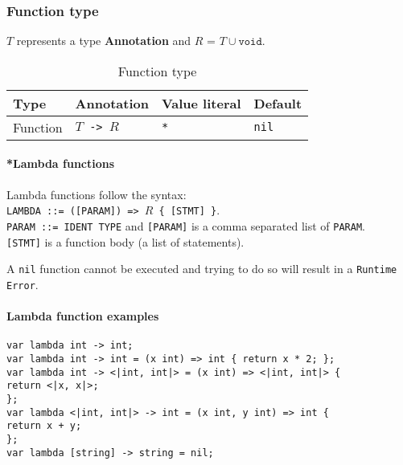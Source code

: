 \documentclass{article}
\begin{document}
\subsubsection{Function type}
$T$ represents a type \textbf{Annotation} and $R$ = $T \cup { \texttt{void} }$.

\begin{table}[h]
\centering
\label{function-type}
\begin{tabular}{|l|l|l|l|} \hline
\textbf{Type} & \textbf{Annotation}  & \textbf{Value literal} & \textbf{Default} \\ \hline
Function      & \texttt{$T$ -> $R$ } & \texttt{*}             & \texttt{nil}     \\ \hline
\end{tabular}
\caption{Function type}
\end{table}

\paragraph{*Lambda functions}
Lambda functions follow the syntax: \\
\texttt{LAMBDA ::= ([PARAM]) => $R$ \{ [STMT] \}}.\\
\texttt{PARAM ::= IDENT TYPE} and \texttt{[PARAM]} is a comma separated list of
\texttt{PARAM}. \\
\texttt{[STMT]} is a function body (a list of statements).

A \texttt{nil} function cannot be executed and trying to do so will result
in a \texttt{Runtime Error}.

\paragraph{Lambda function examples}
\texttt{var lambda int -> int;} \\
\texttt{var lambda int -> int = (x int) => int \{ return x * 2; \};} \\
\texttt{var lambda int -> <|int, int|> = (x int) => <|int, int|> \{ \\
  \hspace*{2em} return <|x, x|>; \\
\};} \\
\texttt{var lambda <|int, int|> -> int = (x int, y int) => int \{ \\
  \hspace*{2em} return x + y; \\
\};} \\
\texttt{var lambda [string] -> string = nil;}
\end{document}
